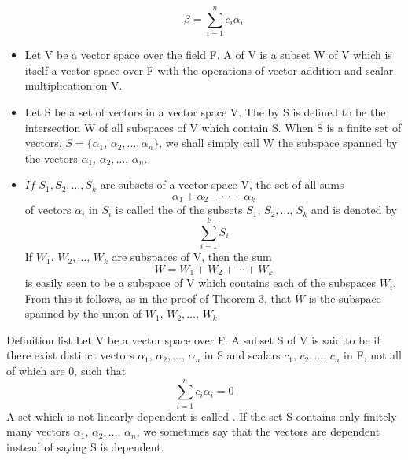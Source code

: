 \documentclass[12pt, a4paper]{article}
\begin{document}
\begin{CJK*}{UTF8}{bsmi}
\begin{itemize}
\begin{equation}
        \beta = \sum_{i=1}^n c_i\alpha_i
    \end{equation}
    \item Let V be a vector space over the field F. A  of V is a subset W of V which is itself a vector space over F with the operations of vector addition and scalar multiplication on V.
    \item Let S be a set of vectors in a vector space V. The  by S is defined to be the intersection W of all subspaces of V which contain S. When S is a finite set of vectors, \(S=\{\alpha_1,\,\alpha_2,\ldots,\alpha_n\}\), we shall simply call W the subspace spanned by the vectors \(\alpha_1,\,\alpha_2,\ldots,\,\alpha_n\).
    \item \(If\) \(S_1,S_2,\ldots,S_k\) are subsets of a vector space V, the set of all sums\begin{equation}
        \alpha_1+\alpha_2+\cdots+\alpha_k
    \end{equation}
    of vectors \(\alpha_i\) in \(S_i\) is called the  of the subsets \(S_1,\,S_2,\ldots,\,S_k\) and is denoted by\begin{equation}
        \sum_{i=1}^k S_i
    \end{equation}
    If \(W_1,\,W_2,\ldots,\,W_k\) are subspaces of V, then the sum\begin{equation}
        W = W_1+W_2+\cdots+W_k
    \end{equation}
    is easily seen to be a subspace of V which contains each of the subspaces \(W_i\). From this it follows, as in the proof of Theorem 3, that \(W\) is the subspace spanned by the union of \(W_1,\,W_2,\ldots,\,W_k\)
\end{itemize}
\st{Definition list}
Let V be a vector space over F. A subset S of V is said to be  if there exist distinct vectors \(\alpha_1,\,\alpha_2,\ldots,\,\alpha_n\) in S and scalars \(c_1,\,c_2,\ldots,\,c_n\) in F, not all of which are 0, such that \begin{equation}
    \sum_{i=1}^n c_i\alpha_i=0
\end{equation}
A set which is not linearly dependent is called . If the set S contains only finitely many vectors \(\alpha_1,\,\alpha_2,\ldots,\,\alpha_n\), we sometimes say that the vectors are dependent instead of saying S is dependent.


\end{CJK*}
\end{document}
